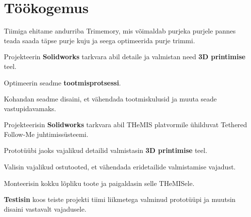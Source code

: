 \documentclass[letterpaper]{deedy-resume} %
\begin{document}
%
\begin{minipage}[t]{0.66\textwidth} %


\section{Töökogemus}


\vspace{\topsep} %
\begin{tightitemize}
  \item Tiimiga ehitame andurriba Trimemory, mis võimaldab purjeka purjele pannes teada saada täpse purje kuju ja seega optimeerida purje trimmi.
  \item Projekteerin \textbf{Solidworks} tarkvara abil detaile ja valmistan need \textbf{3D printimise} teel.
  \item Optimeerin seadme \textbf{tootmisprotsessi}.
  \item Kohandan seadme disaini, et vähendada tootmiskulusid ja muuta seade vastupidavamaks.
\end{tightitemize}

\sectionspace %



\begin{tightitemize}
  \item Projekteerisin \textbf{Solidworks} tarkvara abil THeMIS platvormile ühilduvat Tethered Follow-Me juhtimissüsteemi.
  \item Prototüübi jaoks vajalikud detailid valmistasin \textbf{3D printimise} teel.
  \item Valisin vajalikud ostutooted, et vähendada eridetailide valmistamise vajadust.
  \item Monteerisin kokku lõpliku toote ja paigaldasin selle THeMISele.
  \item \textbf{Testisin} koos teiste projekti tiimi liikmetega valminud prototüüpi ja muutsin disaini vastavalt vajadusele.
\end{tightitemize}


\end{minipage}
\end{document}
